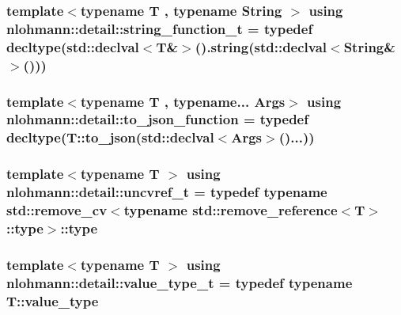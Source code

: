 \subsubsection[{\texorpdfstring{string\+\_\+function\+\_\+t}{string_function_t}}]{\setlength{\rightskip}{0pt plus 5cm}template$<$typename T , typename String $>$ using {\bf nlohmann\+::detail\+::string\+\_\+function\+\_\+t} = typedef decltype(std\+::declval$<$T\&$>$().string(std\+::declval$<$String\&$>$()))}\hypertarget{namespacenlohmann_1_1detail_a27c3fc3bd42ac406f763184aa8ae4cb0}{}\label{namespacenlohmann_1_1detail_a27c3fc3bd42ac406f763184aa8ae4cb0}
\subsubsection[{\texorpdfstring{to\+\_\+json\+\_\+function}{to_json_function}}]{\setlength{\rightskip}{0pt plus 5cm}template$<$typename T , typename... Args$>$ using {\bf nlohmann\+::detail\+::to\+\_\+json\+\_\+function} = typedef decltype(T\+::to\+\_\+json(std\+::declval$<$Args$>$()...))}\hypertarget{namespacenlohmann_1_1detail_af846b6cf2f926009ff3a7a61495ca383}{}\label{namespacenlohmann_1_1detail_af846b6cf2f926009ff3a7a61495ca383}
\subsubsection[{\texorpdfstring{uncvref\+\_\+t}{uncvref_t}}]{\setlength{\rightskip}{0pt plus 5cm}template$<$typename T $>$ using {\bf nlohmann\+::detail\+::uncvref\+\_\+t} = typedef typename std\+::remove\+\_\+cv$<$typename std\+::remove\+\_\+reference$<$T$>$\+::type$>$\+::type}\hypertarget{namespacenlohmann_1_1detail_a53a082eedad9f4729fcd8fed552a21f7}{}\label{namespacenlohmann_1_1detail_a53a082eedad9f4729fcd8fed552a21f7}
\subsubsection[{\texorpdfstring{value\+\_\+type\+\_\+t}{value_type_t}}]{\setlength{\rightskip}{0pt plus 5cm}template$<$typename T $>$ using {\bf nlohmann\+::detail\+::value\+\_\+type\+\_\+t} = typedef typename T\+::value\+\_\+type}\hypertarget{namespacenlohmann_1_1detail_af91beae90c2fb0f931079b3d50a343bc}{}\label{namespacenlohmann_1_1detail_af91beae90c2fb0f931079b3d50a343bc}
